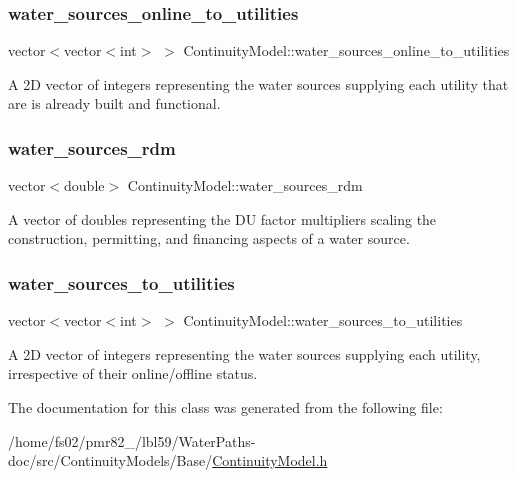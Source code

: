 \subsubsection{\texorpdfstring{water\+\_\+sources\+\_\+online\+\_\+to\+\_\+utilities}{water\_sources\_online\_to\_utilities}}
{\footnotesize\ttfamily vector$<$vector$<$int$>$ $>$ Continuity\+Model\+::water\+\_\+sources\+\_\+online\+\_\+to\+\_\+utilities\hspace{0.3cm}{\ttfamily [protected]}}



A 2D vector of integers representing the water sources supplying each utility that are is already built and functional. 

\mbox{\label{classContinuityModel_ab7b8fa93a6f56b328e425e1ead6cfefa}} 
\subsubsection{\texorpdfstring{water\+\_\+sources\+\_\+rdm}{water\_sources\_rdm}}
{\footnotesize\ttfamily vector$<$double$>$ Continuity\+Model\+::water\+\_\+sources\+\_\+rdm\hspace{0.3cm}{\ttfamily [protected]}}



A vector of doubles representing the DU factor multipliers scaling the construction, permitting, and financing aspects of a water source. 

\mbox{\label{classContinuityModel_ae8516bcbbf52650190277fc8b06c1843}} 
\subsubsection{\texorpdfstring{water\+\_\+sources\+\_\+to\+\_\+utilities}{water\_sources\_to\_utilities}}
{\footnotesize\ttfamily vector$<$vector$<$int$>$ $>$ Continuity\+Model\+::water\+\_\+sources\+\_\+to\+\_\+utilities\hspace{0.3cm}{\ttfamily [protected]}}



A 2D vector of integers representing the water sources supplying each utility, irrespective of their online/offline status. 



The documentation for this class was generated from the following file\+:\begin{DoxyCompactItemize}
\item 
/home/fs02/pmr82\+\_/lbl59/\+Water\+Paths-\/doc/src/\+Continuity\+Models/\+Base/\mbox{\hyperlink{ContinuityModel_8h}{Continuity\+Model.\+h}}\end{DoxyCompactItemize}
